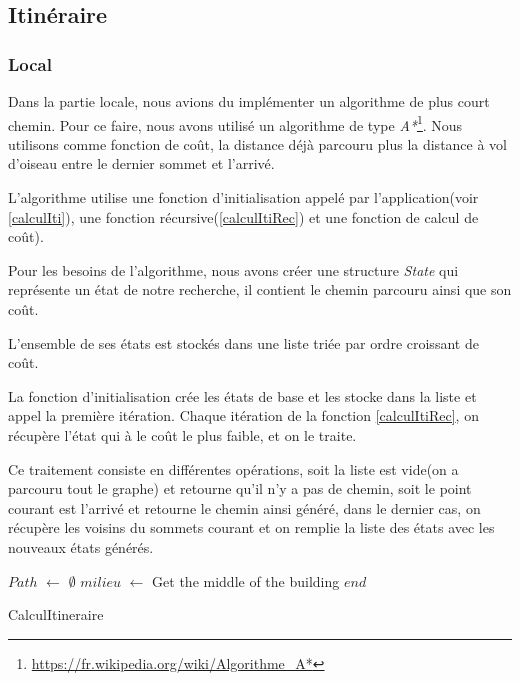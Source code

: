 \subsection{Itinéraire}
\subsubsection{Local}
Dans la partie locale, nous avions du implémenter un algorithme de plus court chemin. Pour ce faire, nous avons utilisé un algorithme de type \emph{A*}\footnote{\url{https://fr.wikipedia.org/wiki/Algorithme_A*}}. Nous utilisons comme fonction de co\^{u}t, la distance déjà parcouru plus la distance à vol d'oiseau entre le dernier sommet et l'arrivé.

L'algorithme utilise une fonction d'initialisation appelé par l'application(voir \ref{calculIti}), une fonction récursive(\ref{calculItiRec}) et une fonction de calcul de co\^{u}t).

Pour les besoins de l'algorithme, nous avons créer une structure \emph{State} qui représente un état de notre recherche, il contient le chemin parcouru ainsi que son co\^{u}t.

L'ensemble de ses états est stockés dans une liste triée par ordre croissant de co\^{u}t.

La fonction d'initialisation crée les états de base et les stocke dans la liste et appel la première itération. Chaque itération de la fonction \ref{calculItiRec}, on récupère l'état qui à le co\^{u}t le plus faible, et on le traite.

Ce traitement consiste en différentes opérations, soit la liste est vide(on a parcouru tout le graphe) et retourne qu'il n'y a pas de chemin, soit le point courant est l'arrivé et retourne le chemin ainsi généré, dans le dernier cas, on récupère les voisins du sommets courant et on remplie la liste des états avec les nouveaux états générés.

\begin{algorithm}[H]
 $Path$ $\gets$ $\emptyset$\;
 $milieu$ $\gets$ Get the middle of the building $end$\;
 
 \caption{CalculItineraire\label{calculIti}}
\end{algorithm}

